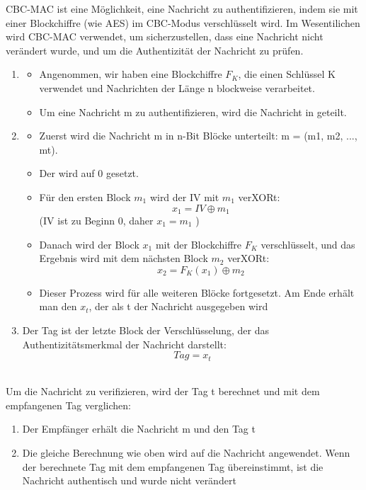 \begin{infoBox}[title=CBC-MAC (Cipher Block Chaining Message Authentication Code)]
    CBC-MAC ist eine Möglichkeit, eine Nachricht zu authentifizieren, indem sie mit einer Blockchiffre (wie AES) im CBC-Modus verschlüsselt wird. Im Wesentilichen wird CBC-MAC verwendet, um sicherzustellen, dass eine Nachricht nicht verändert wurde, und um die Authentizität der Nachricht zu prüfen.\\
    \begin{enumerate}
        \item {}
        \begin{itemize}
            \item Angenommen, wir haben eine Blockchiffre $F_{K}$, die einen Schlüssel K verwendet und Nachrichten der Länge n blockweise verarbeitet.
            \item Um eine Nachricht m zu authentifizieren, wird die Nachricht in  geteilt.
        \end{itemize}
        \item {}
        \begin{itemize}
            \item Zuerst wird die Nachricht m in n-Bit Blöcke unterteilt: m = (m1, m2, ..., mt).
            \item Der  wird auf 0 gesetzt.
            \item Für den ersten Block $m_{1}$ wird der IV mit $m_{1}$ verXORt:
            \[
                x_{1} = IV \oplus m_{1}
            \]
            (IV ist zu Beginn 0, daher $x_{1} = m_{1}$ )
            \item Danach wird der Block $x_{1}$ mit der Blockchiffre $F_{K}$ verschlüsselt, und das Ergebnis wird mit dem nächsten Block $m_{2}$ verXORt:
            \[
                x_{2} = F_{K}(x_{1}) \oplus m_{2}
            \]
            \item Dieser Prozess wird für alle weiteren Blöcke fortgesetzt. Am Ende erhält man den  $x_{t}$, der als  t der Nachricht ausgegeben wird
        \end{itemize}
        \item {} Der Tag ist der letzte Block der Verschlüsselung, der das Authentizitätsmerkmal der Nachricht darstellt:
        \[
            Tag = x_{t}
        \]
    \end{enumerate}
    \\
    Um die Nachricht zu verifizieren, wird der Tag t berechnet und mit dem empfangenen Tag verglichen:
    \begin{enumerate}
        \item Der Empfänger erhält die Nachricht m und den Tag t
        \item Die gleiche Berechnung wie oben wird auf die Nachricht angewendet. Wenn der berechnete Tag mit dem empfangenen Tag übereinstimmt, ist die Nachricht authentisch und wurde nicht verändert
    \end{enumerate}
\end{infoBox}
